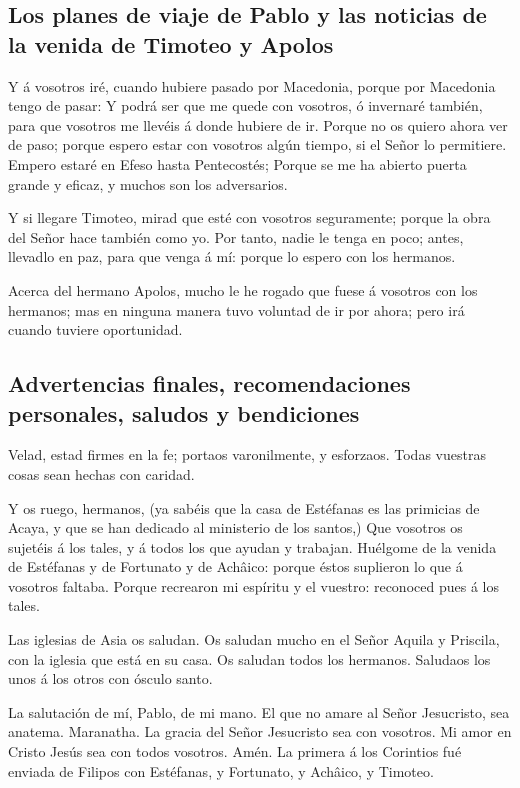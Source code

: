 \hypertarget{los-planes-de-viaje-de-pablo-y-las-noticias-de-la-venida-de-timoteo-y-apolos}{%
\subsection{Los planes de viaje de Pablo y las noticias de la venida de
Timoteo y
Apolos}\label{los-planes-de-viaje-de-pablo-y-las-noticias-de-la-venida-de-timoteo-y-apolos}}

 Y á vosotros iré, cuando hubiere pasado por Macedonia,
porque por Macedonia tengo de pasar:  Y podrá ser que me
quede con vosotros, ó invernaré también, para que vosotros me llevéis á
donde hubiere de ir.  Porque no os quiero ahora ver de
paso; porque espero estar con vosotros algún tiempo, si el Señor lo
permitiere.  Empero estaré en Efeso hasta Pentecostés;
 Porque se me ha abierto puerta grande y eficaz, y muchos
son los adversarios.

 Y si llegare Timoteo, mirad que esté con vosotros
seguramente; porque la obra del Señor hace también como yo.
 Por tanto, nadie le tenga en poco; antes, llevadlo en
paz, para que venga á mí: porque lo espero con los hermanos.

 Acerca del hermano Apolos, mucho le he rogado que fuese
á vosotros con los hermanos; mas en ninguna manera tuvo voluntad de ir
por ahora; pero irá cuando tuviere oportunidad.

\hypertarget{advertencias-finales-recomendaciones-personales-saludos-y-bendiciones}{%
\subsection{Advertencias finales, recomendaciones personales, saludos y
bendiciones}\label{advertencias-finales-recomendaciones-personales-saludos-y-bendiciones}}

 Velad, estad firmes en la fe; portaos varonilmente, y
esforzaos.  Todas vuestras cosas sean hechas con caridad.

 Y os ruego, hermanos, (ya sabéis que la casa de
Estéfanas es las primicias de Acaya, y que se han dedicado al ministerio
de los santos,)  Que vosotros os sujetéis á los tales, y
á todos los que ayudan y trabajan.  Huélgome de la venida
de Estéfanas y de Fortunato y de Achâico: porque éstos suplieron lo que
á vosotros faltaba.  Porque recrearon mi espíritu y el
vuestro: reconoced pues á los tales.

 Las iglesias de Asia os saludan. Os saludan mucho en el
Señor Aquila y Priscila, con la iglesia que está en su casa.
 Os saludan todos los hermanos. Saludaos los unos á los
otros con ósculo santo.

 La salutación de mí, Pablo, de mi mano. 
El que no amare al Señor Jesucristo, sea anatema. Maranatha.
 La gracia del Señor Jesucristo sea con vosotros.
 Mi amor en Cristo Jesús sea con todos vosotros. Amén. La
primera á los Corintios fué enviada de Filipos con Estéfanas, y
Fortunato, y Achâico, y Timoteo.
